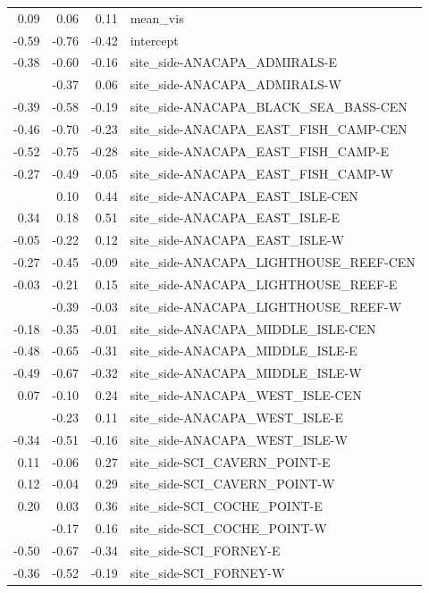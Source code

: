 \documentclass[]{article}
\begin{document}
\begin{longtable}[t]{rrrl}
0.09 & 0.06 & 0.11 & mean\_vis\\
-0.59 & -0.76 & -0.42 & intercept\\
-0.38 & -0.60 & -0.16 & site\_side-ANACAPA\_ADMIRALS-E\\
\addlinespace
-0.16 & -0.37 & 0.06 & site\_side-ANACAPA\_ADMIRALS-W\\
-0.39 & -0.58 & -0.19 & site\_side-ANACAPA\_BLACK\_SEA\_BASS-CEN\\
-0.46 & -0.70 & -0.23 & site\_side-ANACAPA\_EAST\_FISH\_CAMP-CEN\\
-0.52 & -0.75 & -0.28 & site\_side-ANACAPA\_EAST\_FISH\_CAMP-E\\
-0.27 & -0.49 & -0.05 & site\_side-ANACAPA\_EAST\_FISH\_CAMP-W\\
\addlinespace
0.27 & 0.10 & 0.44 & site\_side-ANACAPA\_EAST\_ISLE-CEN\\
0.34 & 0.18 & 0.51 & site\_side-ANACAPA\_EAST\_ISLE-E\\
-0.05 & -0.22 & 0.12 & site\_side-ANACAPA\_EAST\_ISLE-W\\
-0.27 & -0.45 & -0.09 & site\_side-ANACAPA\_LIGHTHOUSE\_REEF-CEN\\
-0.03 & -0.21 & 0.15 & site\_side-ANACAPA\_LIGHTHOUSE\_REEF-E\\
\addlinespace
-0.21 & -0.39 & -0.03 & site\_side-ANACAPA\_LIGHTHOUSE\_REEF-W\\
-0.18 & -0.35 & -0.01 & site\_side-ANACAPA\_MIDDLE\_ISLE-CEN\\
-0.48 & -0.65 & -0.31 & site\_side-ANACAPA\_MIDDLE\_ISLE-E\\
-0.49 & -0.67 & -0.32 & site\_side-ANACAPA\_MIDDLE\_ISLE-W\\
0.07 & -0.10 & 0.24 & site\_side-ANACAPA\_WEST\_ISLE-CEN\\
\addlinespace
-0.06 & -0.23 & 0.11 & site\_side-ANACAPA\_WEST\_ISLE-E\\
-0.34 & -0.51 & -0.16 & site\_side-ANACAPA\_WEST\_ISLE-W\\
0.11 & -0.06 & 0.27 & site\_side-SCI\_CAVERN\_POINT-E\\
0.12 & -0.04 & 0.29 & site\_side-SCI\_CAVERN\_POINT-W\\
0.20 & 0.03 & 0.36 & site\_side-SCI\_COCHE\_POINT-E\\
\addlinespace
-0.01 & -0.17 & 0.16 & site\_side-SCI\_COCHE\_POINT-W\\
-0.50 & -0.67 & -0.34 & site\_side-SCI\_FORNEY-E\\
-0.36 & -0.52 & -0.19 & site\_side-SCI\_FORNEY-W\\

\end{longtable}
\end{document}
